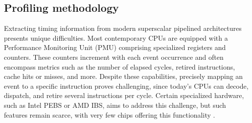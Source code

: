 
\subsection{Profiling methodology}

Extracting timing information from modern superscalar pipelined architectures presents unique difficulties.
Most contemporary CPUs are equipped with a Performance Monitoring Unit (PMU) comprising specialized registers
and counters. These counters increment with each event occurrence and often encompass metrics such as the 
number of elapsed cycles, retired instructions, cache hits or misses, and more. Despite these capabilities, 
precisely mapping an event to a specific instruction proves challenging, since today's CPUs can decode, 
dispatch, and retire several instructions per cycle. Certain specialized hardware, such as Intel PEBS or 
AMD IBS, aims to address this challenge, but such features remain scarce, with very few chips offering this 
functionality \cite{bakhvalovPerformanceAnalysisTuning2020}.

